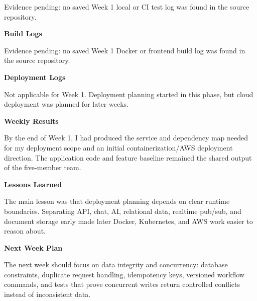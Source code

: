 Evidence pending: no saved Week 1 local or CI test log was found in the
source repository.

\vspace{0.5em}\noindent\textbf{Build Logs}\par

Evidence pending: no saved Week 1 Docker or frontend build log was found
in the source repository.

\vspace{0.5em}\noindent\textbf{Deployment Logs}\par

Not applicable for Week 1. Deployment planning started in this phase,
but cloud deployment was planned for later weeks.

\vspace{0.5em}\noindent\textbf{Weekly Results}\par

By the end of Week 1, I had produced the service and dependency map
needed for my deployment scope and an initial containerization/AWS
deployment direction. The application code and feature baseline remained
the shared output of the five-member team.

\vspace{0.5em}\noindent\textbf{Lessons Learned}\par

The main lesson was that deployment planning depends on clear runtime
boundaries. Separating API, chat, AI, relational data, realtime pub/sub,
and document storage early made later Docker, Kubernetes, and AWS work
easier to reason about.

\vspace{0.5em}\noindent\textbf{Next Week Plan}\par

The next week should focus on data integrity and concurrency: database
constraints, duplicate request handling, idempotency keys, versioned
workflow commands, and tests that prove concurrent writes return
controlled conflicts instead of inconsistent data.
